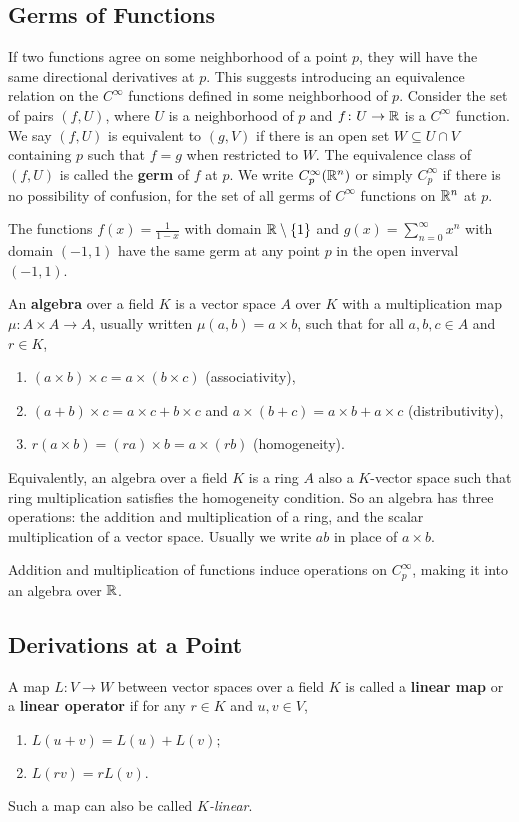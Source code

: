     \subsection{Germs of Functions}
    If two functions agree on some neighborhood of a point $p$, they will have the same directional derivatives at $p$. This suggests introducing an equivalence relation on the $C^{\infty}$ functions defined in some neighborhood of $p$. Consider the set of pairs $(f,U)$, where $U$ is a neighborhood of $p$ and $f \colon U \to \mathbb{R}$ is a $C^{\infty}$ function. We say $(f,U)$ is equivalent to $(g,V)$ if there is an open set  $W\subseteq U\cap V$ containing $p$ such that $f=g$ when restricted to $W$. The equivalence class of $(f,U)$ is called the \textbf{germ} of $f$ at $p$. We write $C_p ^{\infty}(\mathbb{R}^n )$ or simply $C_p^{\infty}$ if there is no possibility of confusion, for the set of all germs of $C^{\infty}$ functions on $\mathbb{R}^n $ at $p$.
    \begin{example}
        The functions $f(x)=\frac{1}{1-x}$ with domain $\mathbb{R} \setminus \{1\} $ and $g(x)=\sum_{n=0}^{\infty} x^n$ with domain $(-1,1)$ have the same germ at any point $p$ in the open inverval $(-1,1)$.
    \end{example}
    An \textbf{algebra} over a field $K$ is a vector space $A$ over $K$ with a multiplication map $\mu \colon A\times A \to A$, usually written $\mu(a,b)=a\times b$, such that for all $a,b,c\in A$ and $r\in K$, 
    \begin{enumerate}[label=(\roman*)]
        \item $(a\times b)\times c=a\times (b\times c)$ (associativity),
        \item $(a+b)\times c=a\times c+b\times c$ and $a\times (b+c)=a\times b+a\times c$ (distributivity),
        \item $r(a\times b)=(ra)\times b=a\times (rb)$ (homogeneity).
    \end{enumerate}
    Equivalently, an algebra over a field $K$ is a ring $A$ also a $K$-vector space such that ring multiplication satisfies the homogeneity condition. So an algebra has three operations: the addition and multiplication of a ring, and the scalar multiplication of a vector space. Usually we write $ab$ in place of $a\times b$.

    Addition and multiplication of functions induce operations on $C_p^{\infty}$, making it into an algebra over $\mathbb{R}$.

    \subsection{Derivations at a Point}
    A map $L \colon V \to W$ between vector spaces over a field $K$ is called a \textbf{linear map} or a \textbf{linear operator} if for any $r\in K$ and $u,v\in V$,
    \begin{enumerate}[label=(\roman*)]
        \item $L(u+v)=L(u)+L(v);$
        \item $L(rv)=rL(v).$
    \end{enumerate}
    Such a map can also be called $K$\emph{-linear}.

